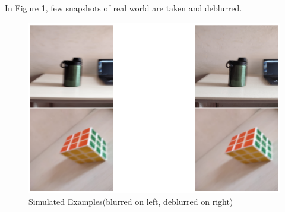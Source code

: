 \documentclass[10pt,twocolumn,letterpaper]{article}
\begin{document}
In Figure \ref{fig:real_pic}, few snapshots of real world are taken and deblurred.
\begin{figure}[!h]

	\includegraphics[width=.5\textwidth]{images/se.png}
	\caption{Simulated Examples(blurred on left, deblurred on right)}
    \label{fig:real_pic}
\end{figure}
\end{document}
